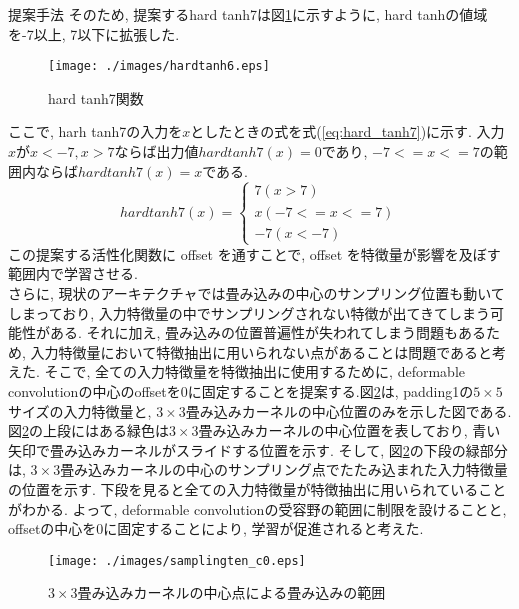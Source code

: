 \begin{chapter}{提案手法}
そのため, 提案するhard tanh7は図\ref{fig:hardtanh6}に示すように, hard tanhの値域を-7以上, 7以下に拡張した. 
\begin{figure}[H]
  \centering
  \texttt{[image: ./images/hardtanh6.eps]}
  \caption{hard tanh7関数}
  \label{fig:hardtanh6}
\end{figure}
ここで, harh tanh7の入力を$x$としたときの式を式(\ref{eq:hard_tanh7})に示す. 入力$x$が$x<-7, x>7$ならば出力値$hardtanh7(x) =0$であり, $-7<=x<=7$の範囲内ならば$hardtanh7(x)=x$である. 
\begin{equation}
  hardtanh7(x) = 
      \begin{cases}
        7  (x>7)\\ 
        x  (-7<=x<=7)\\
        -7  (x<-7) \label{eq:hard_tanh6}
      \end{cases}
\end{equation}
この提案する活性化関数に offset を通すことで, offset を特徴量が影響を及ぼす範囲内で学習させる. \\
さらに, 現状のアーキテクチャでは畳み込みの中心のサンプリング位置も動いてしまっており, 入力特徴量の中でサンプリングされない特徴が出てきてしまう可能性がある.
それに加え, 畳み込みの位置普遍性が失われてしまう問題もあるため, 入力特徴量において特徴抽出に用いられない点があることは問題であると考えた.
そこで, 全ての入力特徴量を特徴抽出に使用するために, deformable convolutionの中心のoffsetを0に固定することを提案する.図\ref{fig:defconv_c0_offset}は, padding1の$5\times5$サイズの入力特徴量と, $3\times3$畳み込みカーネルの中心位置のみを示した図である. 図\ref{fig:defconv_c0_offset}の上段にはある緑色は$3\times3$畳み込みカーネルの中心位置を表しており, 青い矢印で畳み込みカーネルがスライドする位置を示す. そして, 図\ref{fig:defconv_c0_offset}の下段の緑部分は, $3\times3$畳み込みカーネルの中心のサンプリング点でたたみ込まれた入力特徴量の位置を示す. 下段を見ると全ての入力特徴量が特徴抽出に用いられていることがわかる.
よって, deformable convolutionの受容野の範囲に制限を設けることと, offsetの中心を0に固定することにより, 学習が促進されると考えた.

\begin{figure}[H]
  \centering
  \texttt{[image: ./images/samplingten\_c0.eps]}
  \caption{$3\times3$畳み込みカーネルの中心点による畳み込みの範囲}
  \label{fig:defconv_c0_offset}
\end{figure}

\end{chapter}
